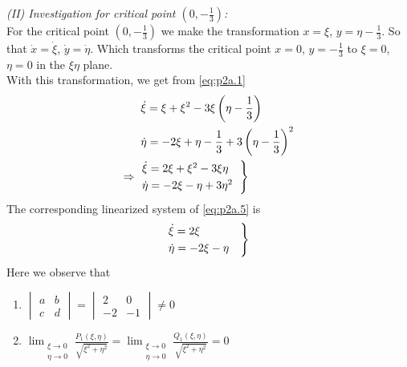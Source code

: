 \documentclass[../main-sheet.tex]{subfiles}
\begin{document}
\begin{soln}[a]
    
    \emph{(II) Investigation for critical point \((0,-\frac{1}{3})\):}\\
    For the critical point \((0,-\frac{1}{3})\) we make the transformation \(x=\xi\), \(y=\eta-\frac{1}{3}\). So that \(\dot{x}=\dot{\xi}\), \(\dot{y}=\dot{\eta}\). Which transforms the critical point \(x=0\), \(y=-\frac{1}{3}\) to \(\xi=0\), \(\eta=0\) in the \(\xi\eta\) plane.\\
    With this transformation, we get from \eqref{eq:p2a.1}
    \begin{align}
        &\dot{\xi}=\xi+\xi^2-3\xi\left(\eta-\frac{1}{3}\right)\notag\\
        &\dot{\eta}=-2\xi+\eta-\frac{1}{3}+3\left(\eta-\frac{1}{3}\right)^2\notag\\
        \Rightarrow\;\;&\begin{aligned}
            \begin{rcases}
                \dot{\xi}=2\xi+\xi^2-3\xi\eta\quad\\
                \dot{\eta}=-2\xi-\eta+3\eta^2
            \end{rcases}
        \end{aligned}\label{eq:p2a.5}
    \end{align}
    The corresponding linearized system of \eqref{eq:p2a.5} is 
    \begin{equation}
        \begin{rcases}
            \dot{\xi}=2\xi\\
            \dot{\eta}=-2\xi-\eta\quad
        \end{rcases}
        \label{eq:p2a.6}
    \end{equation}
    Here we observe that
    \begin{enumerate}[label=(\roman*)]
        \item \(\begin{vmatrix}
            a&b\\
            c&d
        \end{vmatrix}=\begin{vmatrix}
            2&0\\
            -2&-1
        \end{vmatrix}\neq 0\)
        \item \(\displaystyle\lim_{\substack{\xi\to 0 \\ \eta\to 0}} \frac{P_1(\xi,\eta)}{\sqrt{\xi^2+\eta^2}}=\lim_{\substack{\xi\to 0 \\ \eta\to 0}} \frac{Q_1(\xi,\eta)}{\sqrt{\xi^2+\eta^2}}=0\)\\ 
        

\end{enumerate}
\end{soln}
\end{document}
